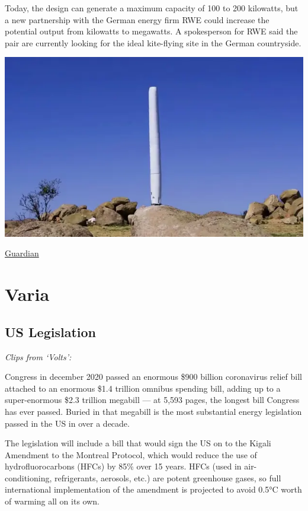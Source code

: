 \documentclass[
]{book}
\begin{document}
Today, the design can generate a maximum capacity of 100 to 200 kilowatts, but a new partnership with the German energy firm RWE could increase the potential output from kilowatts to megawatts. A spokesperson for RWE said the pair are currently looking for the ideal kite-flying site in the German countryside.

\includegraphics{fig/vortex_bladeless_3meter.png}

\href{https://www.theguardian.com/environment/2021/mar/16/good-vibrations-bladeless-turbines-could-bring-wind-power-to-your-home}{Guardian}

\hypertarget{varia}{%
\chapter{Varia}\label{varia}}

\hypertarget{us-legislation}{%
\section{US Legislation}\label{us-legislation}}

\emph{Clips from `Volts':}

Congress in december 2020 passed an enormous \$900 billion coronavirus relief bill attached to an enormous \$1.4 trillion omnibus spending bill, adding up to a super-enormous \$2.3 trillion megabill --- at 5,593 pages, the longest bill Congress has ever passed.
Buried in that megabill is the most substantial energy legislation passed in the US in over a decade.

The legislation will include a bill that would sign the US on to the Kigali Amendment to the Montreal Protocol, which would reduce the use of hydrofluorocarbons (HFCs) by 85\% over 15 years. HFCs (used in air-conditioning, refrigerants, aerosols, etc.) are potent greenhouse gases, so full international implementation of the amendment is projected to avoid 0.5°C worth of warming all on its own.
\end{document}

